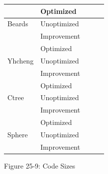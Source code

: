 \begin{center}
\tabletail{}
\tablelasttail{}
\begin{xtabular}{|m{1.1212599in}|m{1.1212599in}|m{1.1212599in}|m{1.1212599in}|m{1.1212599in}|}
\hline
~
 &
 Optimized &
 &
 &
\raggedleft{}\\\hline
 Beards &
 Unoptimized &
 &
 &
\raggedleft{}\\\hline
~
 &
 Improvement &
 &
 &
\raggedleft{}\\\hline
~
 &
 Optimized &
 &
 &
\raggedleft{}\\\hline
 Yhcheng &
 Unoptimized &
 &
 &
\raggedleft{}\\\hline
~
 &
 Improvement &
 &
 &
\raggedleft{}\\\hline
~
 &
 Optimized &
 &
 &
\raggedleft{}\\\hline
 Ctree &
 Unoptimized &
 &
 &
\raggedleft{}\\\hline
~
 &
 Improvement &
 &
 &
\raggedleft{}\\\hline
~
 &
 Optimized &
 &
 &
\raggedleft{}\\\hline
 Sphere &
 Unoptimized &
 &
 &
\raggedleft{}\\\hline
~
 &
 Improvement &
 &
 &
\raggedleft{}\\\hline
\end{xtabular}
\end{center}
{\centering{}
Figure 25-9: Code Sizes
\par}


